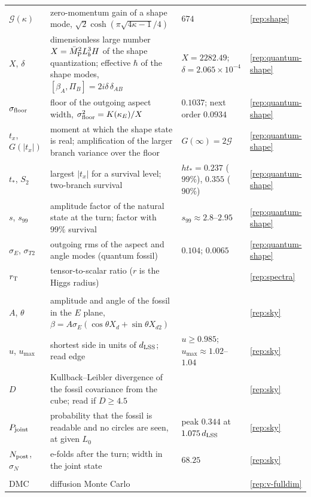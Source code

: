 {\begin{longtable}{@{}>{\raggedright\arraybackslash}p{}>{\raggedright\arraybackslash}p{}>{\raggedright\arraybackslash}p{}>{\raggedright\arraybackslash}p{}@{}}
$\mathcal G(\kappa)$ & zero-momentum gain of a shape mode, $\sqrt2\cosh(\pi\sqrt{4\kappa-1}/4)$ & $674$ & \ref{rep:shape} \\
$X$, $\delta$ & dimensionless large number $X=\bar M_{\mathrm{P}}^2L_b^3H$ of the shape quantization; effective $\hbar$ of the shape modes, $[\beta_A,\Pi_B]=2i\delta\,\delta_{AB}$ & $X=2282.49$; $\delta=2.065\times10^{-4}$ & \ref{rep:quantum-shape} \\
$\sigma_{\mathrm{floor}}$ & floor of the outgoing aspect width, $\sigma_{\mathrm{floor}}^2=K(\kappa_E)/X$ & $0.1037$; next order $0.0934$ & \ref{rep:quantum-shape} \\
$t_x$, $G(|t_x|)$ & moment at which the shape state is real; amplification of the larger branch variance over the floor & $G(\infty)=2\mathcal G$ & \ref{rep:quantum-shape} \\
$t_*$, $S_2$ & largest $|t_x|$ for a survival level; two-branch survival & $h t_*=0.237$ ($99\%$), $0.355$ ($90\%$) & \ref{rep:quantum-shape} \\
$s$, $s_{99}$ & amplitude factor of the natural state at the turn; factor with $99\%$ survival & $s_{99}\approx2.8$--$2.95$ & \ref{rep:quantum-shape} \\
$\sigma_E$, $\sigma_{T2}$ & outgoing rms of the aspect and angle modes (quantum fossil) & $0.104$; $0.0065$ & \ref{rep:quantum-shape} \\
$r_{\mathrm{T}}$ & tensor-to-scalar ratio ($r$ is the Higgs radius) & & \ref{rep:spectra} \\
\addlinespace
\multicolumn{4}{@{}l}{\emph{Microwave background}}\\*
$A$, $\theta$ & amplitude and angle of the fossil in the $E$ plane, $\beta=A\sigma_E(\cos\theta X_d+\sin\theta X_{d2})$ & & \ref{rep:sky} \\
$u$, $u_{\max}$ & shortest side in units of $d_{\mathrm{LSS}}$; read edge & $u\ge0.985$; $u_{\max}\approx1.02$--$1.04$ & \ref{rep:sky} \\
$D$ & Kullback--Leibler divergence of the fossil covariance from the cube; read if $D\ge4.5$ & & \ref{rep:sky} \\
$P_{\rm joint}$ & probability that the fossil is readable and no circles are seen, at given $L_0$ & peak $0.344$ at $1.075\,d_{\mathrm{LSS}}$ & \ref{rep:sky} \\
$N_{\rm post}$, $\sigma_N$ & e-folds after the turn; width in the joint state & $68.25$ & \ref{rep:sky} \\
\addlinespace
\multicolumn{4}{@{}l}{\emph{Methods and abbreviations}}\\*
DMC & diffusion Monte Carlo & & \ref{rep:v-fulldim} \\

\end{longtable}}
